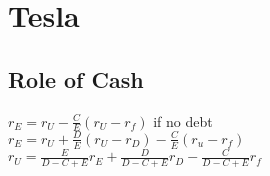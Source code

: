 \section{Tesla}
	\subsection*{Role of Cash}
	$r_{E} = r_{U} - \frac{C}{E}\left(r_{U} - r_{f}\right)$ if no debt\\
	$r_{E} = r_{U} + \frac{D}{E}\left(r_{U} - r_{D}\right) - \frac{C}{E}\left(r_{u} - r_{f}\right)$\\
	$r_{U} = \frac{E}{D - C + E}r_{E} + \frac{D}{D - C + E}r_{D} - \frac{C}{D - C + E}r_{f}$
